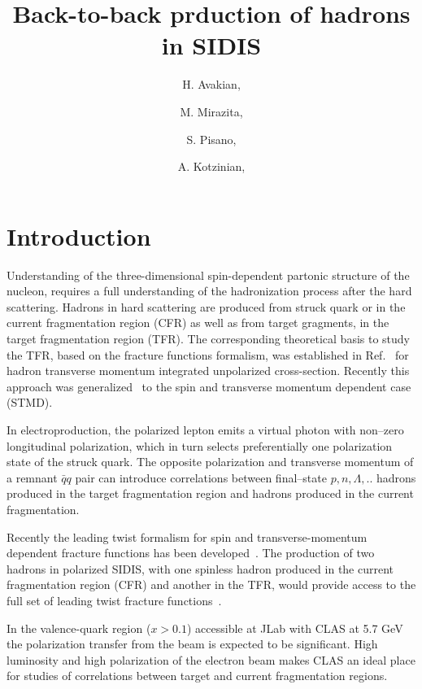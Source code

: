 \documentclass[11pt,a4paper]{article}
\title{ Back-to-back prduction of hadrons in SIDIS}
\author[a]{H. Avakian,}
\author[b]{M. Mirazita,}
\author[b]{S. Pisano,}
\author[c]{A. Kotzinian,}
\affiliation[a]{Thomas Jefferson National Accelerator Facility, Newport News, Virginia 23606, USA}
\affiliation[b]{INFN, Laboratori Nazionali di Frascati, 00044 Frascati, Italy}
\affiliation[c]{YerPHI, Yerevan Physics Institute, Armenia}
\begin{document}
\maketitle


\section{Introduction}

Understanding of the three-dimensional spin-dependent partonic structure of the nucleon, requires a full understanding of the hadronization 
process after the hard scattering.
Hadrons in hard scattering are produced from struck quark or in the current fragmentation region (CFR) as well as from target gragments, 
in the target fragmentation region (TFR).
The corresponding theoretical basis to study the TFR, based on  the fracture functions formalism, was established in Ref.~\cite{Trentadue:1993ka}
for hadron transverse momentum integrated unpolarized cross-section. Recently this approach was generalized~\cite{Anselmino:2011ss} to the spin and transverse momentum dependent case (STMD).

In electroproduction,
the polarized lepton emits a virtual photon with non--zero
longitudinal polarization,
which in turn selects preferentially one polarization state of the struck
quark. The opposite polarization and transverse momentum of a remnant $\bar{q}q$
pair can introduce correlations between  final--state $p,n,\Lambda,..$ hadrons produced 
in the target fragmentation region and hadrons produced in the current fragmentation.

Recently the leading twist formalism for spin and transverse-momentum dependent fracture functions has been  developed~\cite{Anselmino:2011ss}. 
The production of two hadrons in polarized SIDIS, with one spinless hadron produced in the current fragmentation region (CFR) and another in the TFR, would  provide access to the full set of leading twist fracture functions~\cite{Anselmino:2011bb}.


In the valence-quark region ($x > 0.1$) accessible at JLab
with CLAS at 5.7 GeV 
the polarization transfer from the beam is expected to be significant.
High luminosity
and high polarization of the electron beam makes CLAS
an ideal place for studies of correlations between target and current fragmentation regions.

%
\end{document}
